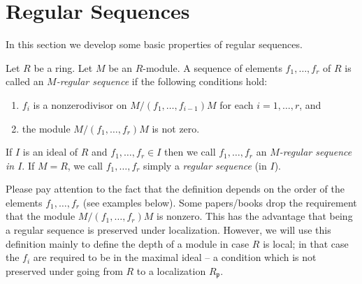 %

\chapter{Regular Sequences}
\label{section-regular-sequences}

\noindent
In this section we develop some basic properties of regular sequences.

\begin{definition}\cite[\href{https://stacks.math.columbia.edu/tag/00LF}{Definition 00LF}]{stacks-project}
	\label{definition-regular-sequence}
	Let $R$ be a ring. Let $M$ be an $R$-module. A sequence of elements
	$f_1, \ldots, f_r$ of $R$ is called an {\it $M$-regular sequence}
	if the following conditions hold:
	\begin{enumerate}
		\item $f_i$ is a nonzerodivisor on
		$M/(f_1, \ldots, f_{i - 1})M$
		for each $i = 1, \ldots, r$, and
		\item the module $M/(f_1, \ldots, f_r)M$ is not zero.
	\end{enumerate}
	If $I$ is an ideal of $R$ and $f_1, \ldots, f_r \in I$
	then we call $f_1, \ldots, f_r$ an {\it $M$-regular sequence
		in $I$}. If $M = R$, we call $f_1, \ldots, f_r$ simply a
	{\it regular sequence} (in $I$).
\end{definition}

\noindent
Please pay attention to the fact that the definition depends on the order
of the elements $f_1, \ldots, f_r$ (see examples below). Some papers/books
drop the requirement that the module $M/(f_1, \ldots, f_r)M$ is nonzero.
This has the advantage that being a regular sequence is preserved under
localization. However, we will use this definition mainly to define the
depth of a module in case $R$ is local; in that case the $f_i$ are required
to be in the maximal ideal -- a condition which is not preserved under going
from $R$ to a localization $R_{\mathfrak p}$.

